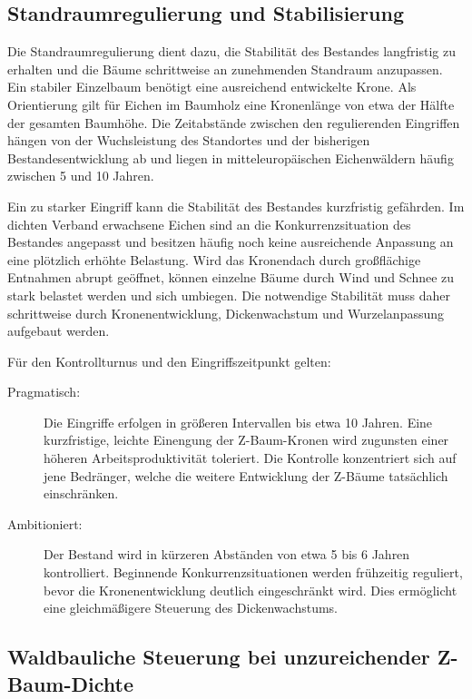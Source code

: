 \documentclass[twocolumn, bibliography=totoc, abstract=true]{scrartcl}
\begin{document}
\subsection{Standraumregulierung und Stabilisierung}

Die Standraumregulierung dient dazu, die Stabilität des Bestandes langfristig zu erhalten und die Bäume schrittweise an zunehmenden Standraum anzupassen. Ein stabiler Einzelbaum benötigt eine ausreichend entwickelte Krone. Als Orientierung gilt für Eichen im Baumholz eine Kronenlänge von etwa der Hälfte der gesamten Baumhöhe. Die Zeitabstände zwischen den regulierenden Eingriffen hängen von der Wuchsleistung des Standortes und der bisherigen Bestandesentwicklung ab und liegen in mitteleuropäischen Eichenwäldern häufig zwischen 5 und 10 Jahren.

Ein zu starker Eingriff kann die Stabilität des Bestandes kurzfristig gefährden. Im dichten Verband erwachsene Eichen sind an die Konkurrenzsituation des Bestandes angepasst und besitzen häufig noch keine ausreichende Anpassung an eine plötzlich erhöhte Belastung. Wird das Kronendach durch großflächige Entnahmen abrupt geöffnet, können einzelne Bäume durch Wind und Schnee zu stark belastet werden und sich umbiegen. Die notwendige Stabilität muss daher schrittweise durch Kronenentwicklung, Dickenwachstum und Wurzelanpassung aufgebaut werden.

Für den Kontrollturnus und den Eingriffszeitpunkt gelten:

\begin{description}
\item[Pragmatisch:] Die Eingriffe erfolgen in größeren Intervallen bis etwa 10 Jahren. Eine kurzfristige, leichte Einengung der Z-Baum-Kronen wird zugunsten einer höheren Arbeitsproduktivität toleriert. Die Kontrolle konzentriert sich auf jene Bedränger, welche die weitere Entwicklung der Z-Bäume tatsächlich einschränken.
\item[Ambitioniert:] Der Bestand wird in kürzeren Abständen von etwa 5 bis 6 Jahren kontrolliert. Beginnende Konkurrenzsituationen werden frühzeitig reguliert, bevor die Kronenentwicklung deutlich eingeschränkt wird. Dies ermöglicht eine gleichmäßigere Steuerung des Dickenwachstums.
\end{description}

\subsection{Waldbauliche Steuerung bei unzureichender Z-Baum-Dichte}
\end{document}
